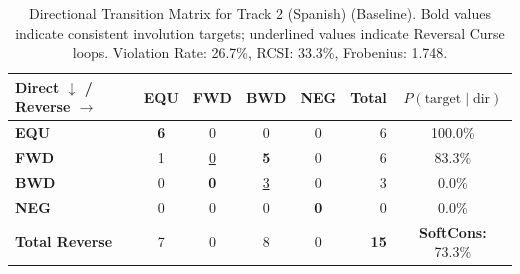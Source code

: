 \begin{table}[ht]
\centering
\small
\begin{tabular}{l|cccc|r|c}
\toprule
\textbf{Direct $\downarrow$ / Reverse $\rightarrow$} & \textbf{EQU} & \textbf{FWD} & \textbf{BWD} & \textbf{NEG} & \textbf{Total} & \textbf{$P(\text{target} \mid \text{dir})$} \\
\midrule
\textbf{EQU} & \textbf{6} & 0 & 0 & 0 & 6 & 100.0\% \\
\textbf{FWD} & 1 & \underline{0} & \textbf{5} & 0 & 6 & 83.3\% \\
\textbf{BWD} & 0 & \textbf{0} & \underline{3} & 0 & 3 & 0.0\% \\
\textbf{NEG} & 0 & 0 & 0 & \textbf{0} & 0 & 0.0\% \\
\midrule
\textbf{Total Reverse} & 7 & 0 & 8 & 0 & \textbf{15} & \textbf{SoftCons:} 73.3\% \\
\bottomrule
\end{tabular}
\caption{Directional Transition Matrix for Track 2 (Spanish) (Baseline). Bold values indicate consistent involution targets; underlined values indicate Reversal Curse loops. Violation Rate: 26.7\%, RCSI: 33.3\%, Frobenius: 1.748.}
\label{tab:transition_matrix}
\end{table}